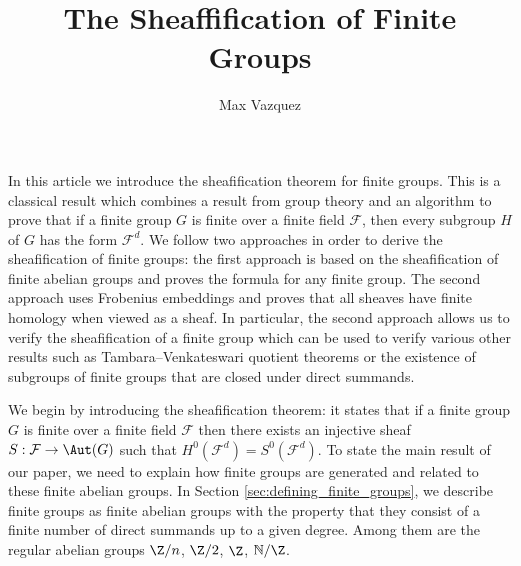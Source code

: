 \documentclass[a4paper,reqno,oneside]{article}
\begin{document}
\title{The Sheaffification of Finite Groups}
\author{Max Vazquez}
\maketitle


In this article we introduce the sheafification theorem for finite groups. This is a classical result which combines a result from  group theory and an algorithm to prove that if a finite group $G$ is finite over a finite field $\mathcal{F}$, then every subgroup $H$ of $G$ has the form $\mathcal{F}^{d}$. We follow two approaches in order to derive the sheafification of finite groups: the first approach is based on the sheafification of finite abelian groups and proves the formula for any finite group. The second approach uses Frobenius embeddings and proves that all sheaves have finite homology when viewed as a sheaf. In particular, the second approach allows us to verify the sheafification of a finite group which can be used to verify various other results such as Tambara--Venkateswari quotient theorems or the existence of subgroups of finite groups that are closed under direct summands. 




We begin by introducing the sheafification theorem: it states that if a finite group $G$ is finite over a finite field $\mathcal{F}$ then there exists an injective sheaf $S:\mathcal{F}\rightarrow \Aut(G)$ such that $H^0(\mathcal{F}^d)=S^0(\mathcal{F}^d)$. To state the main result of our paper, we need to explain how finite groups are generated and related to these finite abelian groups. In Section \ref{sec:defining_finite_groups}, we describe finite groups as finite abelian groups with the property that they consist of a finite number of direct summands up to a given degree. Among them are the regular abelian groups $\Z/n$, $\Z/2$, $\Z$, $\mathbb{N}/\Z$. 
\end{document}
